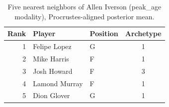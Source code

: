 \begin{table}[htbp]
  \centering\small
  \begin{tabular}{rllc}
    \toprule
    Rank & Player & Position & Archetype \\
    \midrule
    1 & Felipe Lopez & G & 1 \\
    2 & Mike Harris & F & 1 \\
    3 & Josh Howard & F & 3 \\
    4 & Lamond Murray & F & 1 \\
    5 & Dion Glover & G & 1 \\
    \bottomrule
  \end{tabular}
  \caption{Five nearest neighbors of Allen Iverson (peak_age modality), Procrustes-aligned posterior mean.}
  \label{tab:Allen_Iverson_neighbors_peak_age}
\end{table}

